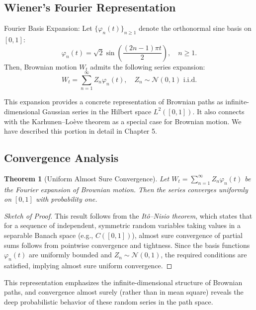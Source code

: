 \documentclass[12pt]{report}
\newtheorem{theorem}{Theorem}[section]
\begin{document}
\subsection{Wiener’s Fourier Representation}

Fourier Basis Expansion: Let $\{\varphi_n(t)\}_{n \geq 1}$ denote the orthonormal sine basis on $[0,1]$:
\[
\varphi_n(t) = \sqrt{2} \sin\left( \frac{(2n - 1)\pi t}{2} \right), \quad n \geq 1.
\]
Then, Brownian motion $W_t$ admits the following series expansion:
\[
W_t = \sum_{n=1}^\infty Z_n \varphi_n(t), \quad Z_n \sim \mathcal{N}(0,1) \text{ i.i.d.}
\]

This expansion provides a concrete representation of Brownian paths as infinite-dimensional Gaussian series in the Hilbert space $L^2([0,1])$. It also connects with the Karhunen–Loève theorem as a special case for Brownian motion. We have described this portion in detail in Chapter 5.

\subsection{Convergence Analysis}

\begin{theorem}[Uniform Almost Sure Convergence]\label{thm:fourier_convergence}
Let $W_t = \sum_{n=1}^\infty Z_n \varphi_n(t)$ be the Fourier expansion of Brownian motion. Then the series converges uniformly on $[0,1]$ with probability one.
\end{theorem}

\begin{proof}[Sketch of Proof]
This result follows from the \textit{Itô–Nisio theorem}, which states that for a sequence of independent, symmetric random variables taking values in a separable Banach space (e.g., $C([0,1])$), almost sure convergence of partial sums follows from pointwise convergence and tightness. Since the basis functions $\varphi_n(t)$ are uniformly bounded and $Z_n \sim \mathcal{N}(0,1)$, the required conditions are satisfied, implying almost sure uniform convergence.
\end{proof}

This representation emphasizes the infinite-dimensional structure of Brownian paths, and convergence almost surely (rather than in mean square) reveals the deep probabilistic behavior of these random series in the path space.
\end{document}
